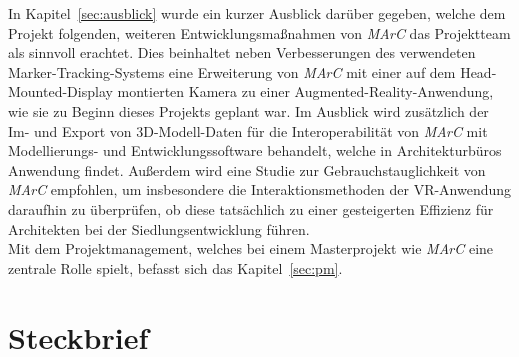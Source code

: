 In Kapitel~\ref{sec:ausblick} wurde ein kurzer Ausblick darüber gegeben, welche dem Projekt folgenden, weiteren Entwicklungsmaßnahmen von \emph{MArC} das Projektteam als sinnvoll erachtet. Dies beinhaltet neben Verbesserungen des verwendeten Marker-Tracking-Systems eine Erweiterung von \emph{MArC} mit einer auf dem Head-Mounted-Display montierten Kamera zu einer Augmented-Reality-Anwendung, wie sie zu Beginn dieses Projekts geplant war. Im Ausblick wird zusätzlich der Im- und Export von 3D-Modell-Daten für die Interoperabilität von \emph{MArC} mit Modellierungs- und Entwicklungssoftware behandelt, welche in Architekturbüros Anwendung findet. Außerdem wird eine Studie zur Gebrauchstauglichkeit von \emph{MArC} empfohlen, um insbesondere die Interaktionsmethoden der VR-Anwendung daraufhin zu überprüfen, ob diese tatsächlich zu einer gesteigerten Effizienz für Architekten bei der Siedlungsentwicklung führen.\\
Mit dem Projektmanagement, welches bei einem Masterprojekt wie \emph{MArC} eine zentrale Rolle spielt, befasst sich das Kapitel~\ref{sec:pm}.

\section{Steckbrief}